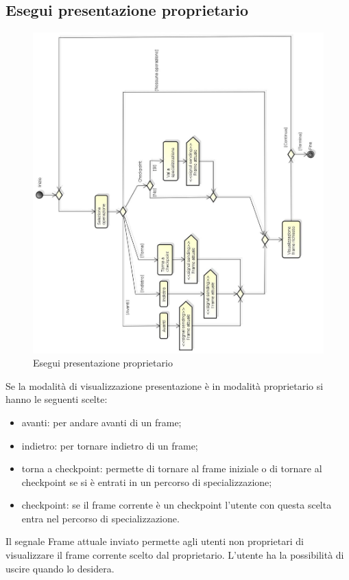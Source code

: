 \newpage

\subsection{Esegui presentazione proprietario}

\begin{figure}[h!]
		\centering
		\includegraphics[scale=.4]{img/Esegui_presentazione_proprietario.jpg}
		\caption{Esegui presentazione proprietario}
		\label{fig:Esegui_presentazione_proprietario}
\end{figure}

Se la modalità di visualizzazione presentazione è in modalità proprietario si hanno le seguenti scelte: 
\begin{itemize}
\item
avanti: per andare avanti di un frame; 
\item 
indietro: per tornare indietro di un frame;
\item torna a checkpoint: permette di tornare al frame iniziale o di tornare al checkpoint se si è entrati in un percorso di specializzazione; 
\item checkpoint: se il frame corrente è un checkpoint l'utente con questa scelta entra nel percorso di specializzazione.
\end{itemize}
Il segnale Frame attuale inviato permette agli utenti non proprietari di visualizzare il frame corrente scelto dal proprietario.
L'utente ha la possibilità di uscire quando lo desidera.

